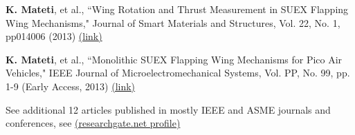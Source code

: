 \item \textbf{K. Mateti}, et al., ``Wing Rotation and Thrust Measurement in SUEX Flapping Wing Mechanisms," 
	Journal of Smart Materials and Structures, Vol. 22, No. 1, pp014006 (2013)
	\href{https://iopscience.iop.org/article/10.1088/0964-1726/22/1/014006/meta}{(link)}

\item \textbf{K. Mateti}, et al., ``Monolithic SUEX Flapping Wing Mechanisms for Pico Air Vehicles," 
IEEE Journal of Microelectromechanical Systems, Vol. PP, No. 99, pp. 1-9 (Early Access, 2013) \href{https://ieeexplore.ieee.org/document/6377222}{(link)}

\item See additional 12 articles published in mostly IEEE and ASME journals and conferences, 
see \href{https://www.researchgate.net/profile/Kiron_Mateti}{(researchgate.net profile)} 
